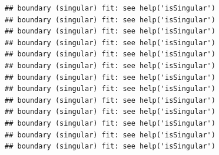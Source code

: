 \documentclass[
  12pt,
]{krantz}
\newenvironment{Shaded}{\begin{snugshade}}{\end{snugshade}}
\newcommand{\AttributeTok}[1]{\textcolor[rgb]{0.77,0.63,0.00}{#1}}
\newcommand{\ConstantTok}[1]{\textcolor[rgb]{0.00,0.00,0.00}{#1}}
\newcommand{\ControlFlowTok}[1]{\textcolor[rgb]{0.13,0.29,0.53}{\textbf{#1}}}
\newcommand{\DecValTok}[1]{\textcolor[rgb]{0.00,0.00,0.81}{#1}}
\newcommand{\DocumentationTok}[1]{\textcolor[rgb]{0.56,0.35,0.01}{\textbf{\textit{#1}}}}
\newcommand{\FloatTok}[1]{\textcolor[rgb]{0.00,0.00,0.81}{#1}}
\newcommand{\FunctionTok}[1]{\textcolor[rgb]{0.00,0.00,0.00}{#1}}
\newcommand{\NormalTok}[1]{#1}
\newcommand{\OtherTok}[1]{\textcolor[rgb]{0.56,0.35,0.01}{#1}}
\newcommand{\SpecialCharTok}[1]{\textcolor[rgb]{0.00,0.00,0.00}{#1}}
\newcommand{\StringTok}[1]{\textcolor[rgb]{0.31,0.60,0.02}{#1}}
\theoremstyle{definition}
\theoremstyle{definition}
\theoremstyle{definition}
\theoremstyle{definition}
\theoremstyle{remark}
\begin{document}
\begin{Shaded}
\end{Shaded}

\begin{verbatim}
## boundary (singular) fit: see help('isSingular')
## boundary (singular) fit: see help('isSingular')
## boundary (singular) fit: see help('isSingular')
## boundary (singular) fit: see help('isSingular')
## boundary (singular) fit: see help('isSingular')
## boundary (singular) fit: see help('isSingular')
## boundary (singular) fit: see help('isSingular')
## boundary (singular) fit: see help('isSingular')
## boundary (singular) fit: see help('isSingular')
## boundary (singular) fit: see help('isSingular')
## boundary (singular) fit: see help('isSingular')
## boundary (singular) fit: see help('isSingular')
## boundary (singular) fit: see help('isSingular')
\end{verbatim}
\end{document}
